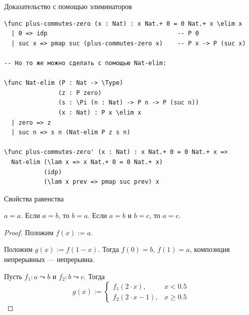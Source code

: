 \documentclass[aspectratio=169]{beamer}
\begin{document}
\begin{frame}[fragile]{Доказательство с помощью элиминаторов}
\small\color[HTML]{025002}\begin{verbatim}
\func plus-commutes-zero (x : Nat) : x Nat.+ 0 = 0 Nat.+ x \elim x
  | 0 => idp                                    -- P 0
  | suc x => pmap suc (plus-commutes-zero x)    -- P x -> P (suc x)

-- Но то же можно сделать с помощью Nat-elim:

\func Nat-elim (P : Nat -> \Type)
               (z : P zero)
               (s : \Pi (n : Nat) -> P n -> P (suc n))
               (x : Nat) : P x \elim x
  | zero => z
  | suc n => s n (Nat-elim P z s n)

\func plus-commutes-zero' (x : Nat) : x Nat.+ 0 = 0 Nat.+ x =>
  Nat-elim (\lam x => x Nat.+ 0 = 0 Nat.+ x) 
           (idp) 
           (\lam x prev => pmap suc prev) x
\end{verbatim}\normalsize
\color{black}
\end{frame}


\begin{frame}{Свойства равенства}
\begin{thm}
$a = a$.
Если $a = b$, то $b = a$.
Если $a = b$ и $b = c$, то $a = c$.
\end{thm}
\begin{proof}
Положим $f(x) := a$.

Положим $g(x) := f(1 - x)$. Тогда $f(0) = b$, $f(1) = a$, композиция непрерывных --- непрерывна.

Пусть $f_1: a \leadsto b$ и $f_2: b \leadsto c$.
Тогда $$g(x) := \left\{\begin{array}{ll}f_1(2\cdot x),& x < 0.5\\f_2(2\cdot x -1),& x\ge 0.5\end{array}\right.$$
\end{proof}
\end{frame}
\end{document}
